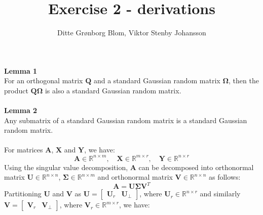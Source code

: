 \documentclass{article}
\title{Exercise 2 - derivations}
\author{Ditte Grønborg Blom, Viktor Stenby Johansson}
\begin{document}
\maketitle
\noindent \textbf{Lemma 1}\\
For an orthogonal matrix $\mathbf{Q}$ and a standard Gaussian random matrix $\mathbf{\Omega}$, then the product $\mathbf{Q}\mathbf{\Omega}$ is also a standard Gaussian random matrix. \\\\
\textbf{Lemma 2} \\
Any submatrix of a standard Gaussian random matrix is a standard Gaussian random matrix.
\\\\
For matrices $\mathbf{A}$, $\mathbf{X}$ and $\mathbf{Y}$, we have:
\begin{equation}
\mathbf{A} \in \mathbb{R}^{n \times m}, \quad \mathbf{X} \in \mathbb{R}^{m \times r}, \quad \mathbf{Y} \in \mathbb{R}^{n \times r}\nonumber	
\end{equation}
Using the singular value decomposition, $\mathbf{A}$ can be decomposed into orthonormal matrix $\mathbf{U} \in \mathbb{R}^{n \times n}$, $\mathbf{\Sigma} \in \mathbb{R}^{n \times m}$ and orthonormal matrix $\mathbf{V} \in \mathbb{R}^{n \times n}$ as follows:
\begin{equation*}
\mathbf{A} = \mathbf{U}\mathbf{\Sigma}\mathbf{V}^T
\end{equation*}
Partitioning $\mathbf{U}$ and $\mathbf{V}$ as  $\mathbf{U} = \begin{bmatrix} \mathbf{U}_r & \mathbf{U}_\perp \end{bmatrix}$, where $\mathbf{U}_r \in \mathbb{R}^{n \times r}$ and similarly $\mathbf{V} = \begin{bmatrix} \mathbf{V}_r & \mathbf{V}_\perp \end{bmatrix}$, where $\mathbf{V}_r \in \mathbb{R}^{m \times r}$, we have:
\end{document}
